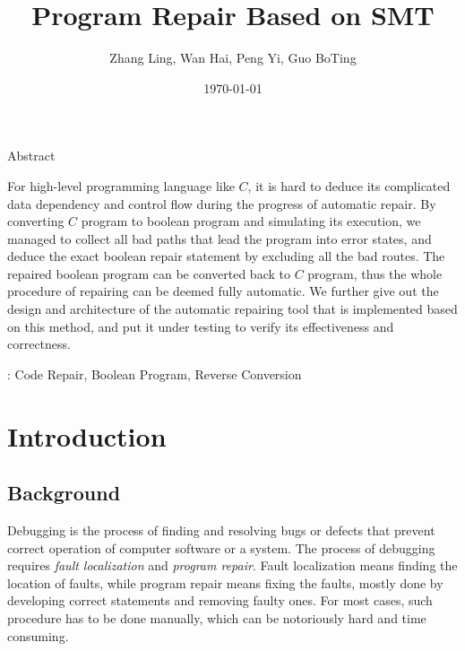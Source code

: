 \documentclass[10pt,journal,final,]{article}
\newcommand{\emptyline}{\vspace{\baselineskip}}
\theoremstyle{definition}
\begin{document}
\title{Program Repair Based on SMT}
\author{Zhang Ling, Wan Hai, Peng Yi, Guo BoTing}
\date{\today}
\maketitle

\begin{center}
\label{section:Abstract}
{\Large Abstract}
\end{center}

For high-level programming language like $C$, it is hard to deduce its complicated data dependency and control flow during the progress of automatic repair.
By converting $C$ program to boolean program and simulating its execution, we managed to collect all bad paths that lead the program into error states, and deduce the exact boolean repair statement by excluding all the bad routes. The repaired boolean program can be converted back to $C$ program, thus the whole procedure of repairing can be deemed fully automatic.
We further give out the design and architecture of the automatic repairing tool that is implemented based on this method, and put it under testing to verify its effectiveness and correctness.

\emptyline
: Code Repair, Boolean Program, Reverse Conversion

\section{Introduction}
\label{section:Introduction}
\subsection{Background}
\label{section:Background}

Debugging is the process of finding and resolving bugs or defects that prevent correct operation of computer software or a system\cite{APD}.
The process of debugging requires {\it fault localization} and {\it program repair}\cite{SPBPRUS}.
Fault localization means finding the location of faults,
while program repair means fixing the faults, mostly done by developing correct statements and removing faulty ones\cite{LCoPF}.
For most cases, such procedure has to be done manually, which can be notoriously hard and time consuming.
\end{document}
